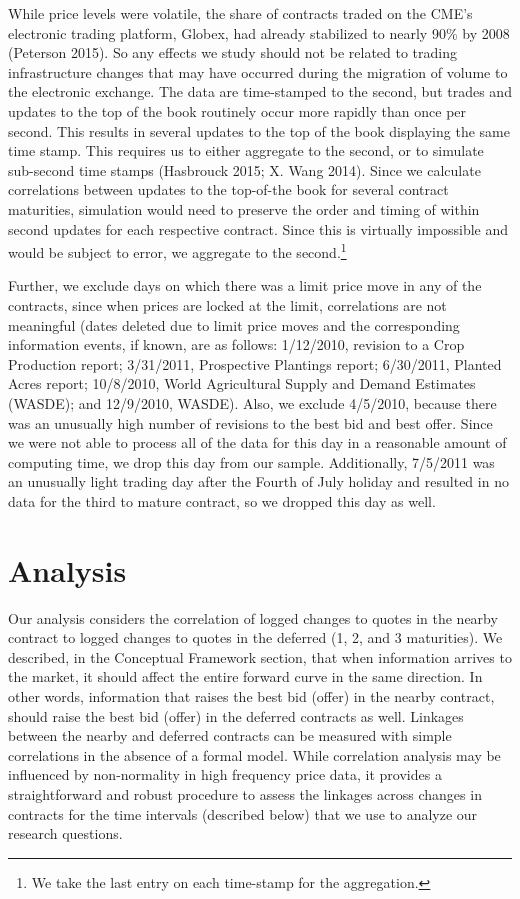 \documentclass[review,12pt]{elsarticle}
\begin{document}
While price levels were volatile, the share of contracts traded on the
CME's electronic trading platform, Globex, had already stabilized to
nearly 90\% by 2008 (Peterson 2015). So any effects we study should not
be related to trading infrastructure changes that may have occurred
during the migration of volume to the electronic exchange. The data are
time-stamped to the second, but trades and updates to the top of the
book routinely occur more rapidly than once per second. This results in
several updates to the top of the book displaying the same time stamp.
This requires us to either aggregate to the second, or to simulate
sub-second time stamps (Hasbrouck 2015; X. Wang 2014). Since we
calculate correlations between updates to the top-of-the book for
several contract maturities, simulation would need to preserve the order
and timing of within second updates for each respective contract. Since
this is virtually impossible and would be subject to error, we aggregate
to the second.\footnote{We take the last entry on each time-stamp for
  the aggregation.}

Further, we exclude days on which there was a limit price move in any of
the contracts, since when prices are locked at the limit, correlations
are not meaningful (dates deleted due to limit price moves and the
corresponding information events, if known, are as follows: 1/12/2010,
revision to a Crop Production report; 3/31/2011, Prospective Plantings
report; 6/30/2011, Planted Acres report; 10/8/2010, World Agricultural
Supply and Demand Estimates (WASDE); and 12/9/2010, WASDE). Also, we
exclude 4/5/2010, because there was an unusually high number of
revisions to the best bid and best offer. Since we were not able to
process all of the data for this day in a reasonable amount of computing
time, we drop this day from our sample. Additionally, 7/5/2011 was an
unusually light trading day after the Fourth of July holiday and
resulted in no data for the third to mature contract, so we dropped this
day as well.

\section{Analysis}\label{analysis}

Our analysis considers the correlation of logged changes to quotes in
the nearby contract to logged changes to quotes in the deferred (1, 2,
and 3 maturities). We described, in the Conceptual Framework section,
that when information arrives to the market, it should affect the entire
forward curve in the same direction. In other words, information that
raises the best bid (offer) in the nearby contract, should raise the
best bid (offer) in the deferred contracts as well. Linkages between the
nearby and deferred contracts can be measured with simple correlations
in the absence of a formal model. While correlation analysis may be
influenced by non-normality in high frequency price data, it provides a
straightforward and robust procedure to assess the linkages across
changes in contracts for the time intervals (described below) that we
use to analyze our research questions.
\end{document}
